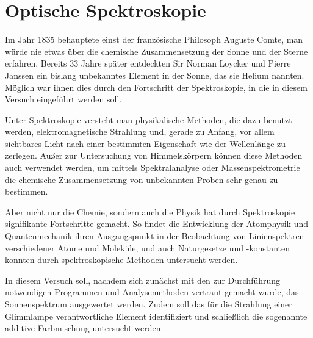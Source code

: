 \chapter{Optische Spektroskopie}
Im Jahr 1835 behauptete einst der französische Philosoph Auguste Comte, man würde nie etwas über die chemische Zusammensetzung der Sonne und der Sterne erfahren. Bereits 33 Jahre später entdeckten Sir Norman Loycker und Pierre Janssen ein bislang unbekanntes Element in der Sonne, das sie Helium nannten. Möglich war ihnen dies durch den Fortschritt der Spektroskopie, in die in diesem Versuch eingeführt werden soll.

Unter Spektroskopie versteht man physikalische Methoden, die dazu benutzt werden, elektromagnetische Strahlung und, gerade zu Anfang, vor allem sichtbares Licht nach einer bestimmten Eigenschaft wie der Wellenlänge zu zerlegen. Außer zur Untersuchung von Himmelskörpern können diese Methoden auch verwendet werden, um mittels Spektralanalyse oder Massenspektrometrie die chemische Zusammensetzung von unbekannten Proben sehr genau zu bestimmen. 

Aber nicht nur die Chemie, sondern auch die Physik hat durch Spektroskopie signifikante Fortschritte gemacht. So findet die Entwicklung der Atomphysik und  Quantenmechanik ihren Ausgangspunkt in der Beobachtung von Linienspektren verschiedener Atome und Moleküle, und auch Naturgesetze und -konstanten konnten durch spektroskopische Methoden untersucht werden.

In diesem Versuch soll, nachdem sich zunächst mit den zur Durchführung notwendigen Programmen und Analysemethoden vertraut gemacht wurde, das Sonnenspektrum ausgewertet werden. Zudem soll das für die Strahlung einer Glimmlampe verantwortliche Element identifiziert und schließlich die sogenannte additive Farbmischung untersucht werden.

